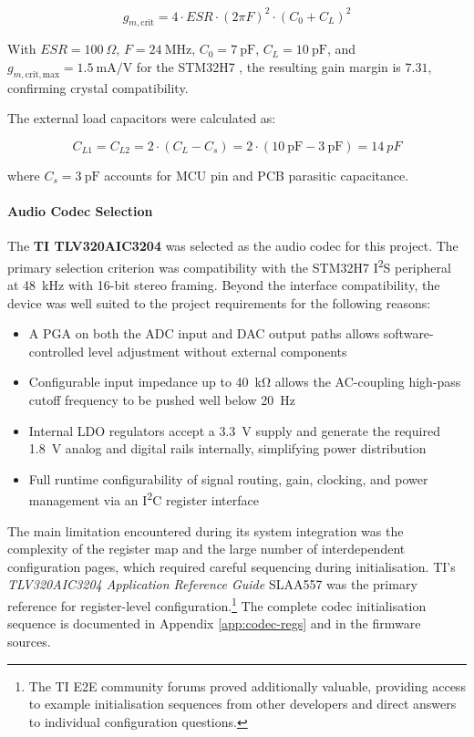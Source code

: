 \begin{equation}
g_{m,\mathrm{crit}} = 4 \cdot ESR \cdot (2\pi F)^2 \cdot (C_0 + C_L)^2
\end{equation}

With $ESR = 100~\Omega$, $F = 24~\text{MHz}$, $C_0 = 7~\text{pF}$, $C_L = 10~\text{pF}$, and $g_{m,\mathrm{crit,max}} = 1.5~\mathrm{mA/V}$ for the STM32H7 \cite[p.~107]{stmicroelectronicsStm32h7a3riDatasheet}, the resulting gain margin is $7.31$, confirming crystal compatibility.

The external load capacitors were calculated as:

\begin{equation}
C_{L1} = C_{L2} = 2 \cdot (C_L - C_s) = 2 \cdot (10~\text{pF} - 3~\text{pF}) = \qty{14}{pF}
\end{equation}

where $C_s = 3~\text{pF}$ accounts for MCU pin and PCB parasitic capacitance.

\paragraph{Audio Codec Selection}
The \textbf{TI TLV320AIC3204} was selected as the audio codec for this project. 
The primary selection criterion was compatibility with the STM32H7 I\textsuperscript{2}S peripheral at \qty{48}{\kilo\hertz} with 16-bit stereo framing. 
Beyond the interface compatibility, the device was well suited to the project requirements for the following reasons:

\begin{itemize}
    \item A \ac{PGA} on both the ADC input and \ac{DAC} output 
    paths allows software-controlled level adjustment without external components
    \item Configurable input impedance up to \qty{40}{\kilo\ohm} allows the 
    AC-coupling high-pass cutoff frequency to be pushed well below \qty{20}{\hertz}
    \item Internal LDO regulators accept a \qty{3.3}{\volt} supply and generate the 
    required \qty{1.8}{\volt} analog and digital rails internally, simplifying power 
    distribution
    \item Full runtime configurability of signal routing, gain, clocking, and power 
    management via an I\textsuperscript{2}C register interface
\end{itemize}

The main limitation encountered during its system integration was the complexity of the register map and the large number of interdependent configuration pages, which required careful sequencing during initialisation.
TI's \textit{TLV320AIC3204 Application Reference Guide} SLAA557 \cite{TLV320AIC3204ApplicationReference2012} was the primary reference for register-level configuration.\footnote{The TI E2E community forums \cite{TIE2ESupport} proved additionally valuable, providing access to example initialisation sequences from other developers and direct answers to individual configuration questions.}
The complete codec initialisation sequence is documented in Appendix \ref{app:codec-regs} and in the firmware sources.